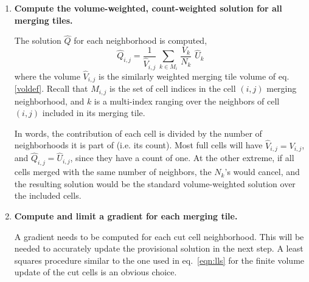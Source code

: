 \begin{enumerate}
\item
{\bf Compute the volume-weighted,  count-weighted solution for all
merging tiles.}   

\vspace*{.1in}
The solution $\widehat{Q}$ for each neighborhood is computed,
\begin{equation}
\label{tiledef}
\widehat{Q}_{i,j} =  \frac{1}{{\widehat V}_{i,j}} \, \sum_{k \in M_i} \,  
\frac{V_k}{N_k}  \,\,  \widehat{U}_k
\end{equation}
where the volume ${\widehat V}_{i,j}$ is the 
similarly weighted merging tile volume of eq. \eqref{voldef}.
Recall that $M_{i,j}$ is the set of cell indices in the cell $(i,j)$ merging
neighborhood, and  
$k$ is  a multi-index ranging over the neighbors 
of cell $(i,j)$ included in its merging tile.

In words, the contribution of each cell is divided by the number of neighborhoods 
it is part of (i.e. its count). 
Most full cells will have ${\widehat V}_{i,j} = V_{i,j}$, 
and $\widehat{Q}_{i,j}  = \widehat{U}_{i,j}$, since they have a count of one.
At the other extreme, if all cells merged with the same number of neighbors, the $N_k$'s
would cancel, and the resulting solution would be the standard volume-weighted
solution over the included cells. 

\item
{\bf Compute and limit a gradient for each merging tile.}

\vspace*{.1in}
A gradient needs to be computed for each cut cell neighborhood. This will be needed
to accurately update the provisional solution in the next step.
A least squares procedure  similar to the one used in eq.~\eqref{eqn:lls} 
for the finite volume update of the cut cells is an 
obvious choice.  


\end{enumerate}
